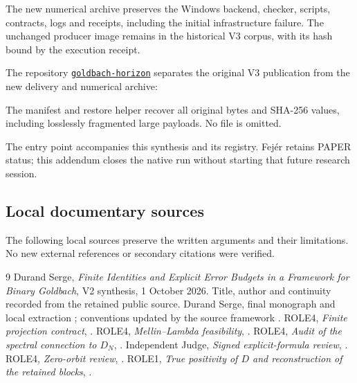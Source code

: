 \documentclass[11pt,a4paper]{article}
\theoremstyle{remark}
\begin{document}
The new numerical archive preserves the Windows backend, checker, scripts,
contracts, logs and receipts, including the initial infrastructure failure.
The unchanged producer image remains in the historical V3 corpus, with its
hash bound by the execution receipt.

The repository \href{https://github.com/seisner1967-hash/goldbach-horizon}
{\texttt{goldbach-horizon}} separates the original V3 publication from the
new delivery and numerical archive:\par\noindent
{}\par\noindent
{}\par
The manifest and restore helper recover all original bytes and SHA-256
values, including losslessly fragmented large payloads. No file is omitted.

The entry point  accompanies this synthesis and
its registry. Fej\'er retains PAPER status; this addendum closes the native
run without starting that future research session.
\endgroup

\subsection*{Local documentary sources}
The following local sources preserve the written arguments and their
limitations. No new external references or secondary citations were verified.
\begin{thebibliography}{9}\small
\setlength{\itemsep}{0pt}\setlength{\parskip}{0pt}
 Durand Serge, \emph{Finite Identities and Explicit Error Budgets
in a Framework for Binary Goldbach}, V2 synthesis, 1 October 2026.
Title, author and continuity recorded from the retained public source.
 Durand Serge, final monograph and local extraction
; conventions updated by the source framework
.
 ROLE4, \emph{Finite projection contract},
.
 ROLE4, \emph{Mellin--Lambda feasibility},
.
 ROLE4, \emph{Audit of the spectral connection to $D_N$},
.
 Independent Judge, \emph{Signed explicit-formula review},
.
 ROLE4, \emph{Zero-orbit review},
.
 ROLE1, \emph{True positivity of $D$ and reconstruction
of the retained blocks},
.
\end{thebibliography}
\end{document}

